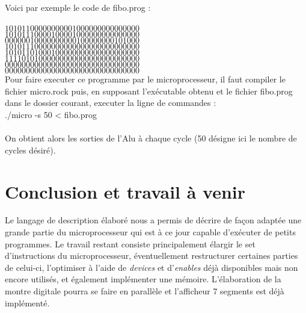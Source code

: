 \documentclass[13pt]{article}
\begin{document}
Voici par exemple le code de fibo.prog :\\
\textit{}\\
$10101100000000001000000000000000$\\
$10101110000100001000000000000000$\\
$00000010000000000100000000101000$\\
$10101110000000000000000000000000$\\
$10101101000100000000000000000000$\\
$11110101000000000000000000000000$\\
$00000000000000000000000000000000$\\
$00000000000000000000000000000000$\\


Pour faire executer ce programme par le microprocesseur, 
il faut compiler le fichier micro.rock
puis, en supposant l'exécutable obtenu et le fichier 
fibo.prog dans le dossier courant, executer la ligne de 
commandes : \\
./micro -s 50 < fibo.prog\\
\textit{}\\
On obtient alors les sorties de l'Alu à chaque cycle 
(50 désigne ici le nombre de cycles désiré).

\section{Conclusion et travail à venir}

Le langage de description élaboré nous a permis 
de décrire de façon adaptée
une grande partie du microprocesseur qui 
est à ce jour capable d'exécuter de petits programmes.
Le travail restant consiste principalement élargir 
le set d'instructions du microprocesseur, éventuellement 
restructurer certaines parties de celui-ci, l'optimiser à l'aide 
de 
\textit{devices} et d'\textit{enables} déjà disponibles mais
non encore utilisés, et également implémenter une mémoire.
L'élaboration de la montre digitale pourra se faire en 
parallèle et l'afficheur 7 segments est déjà implémenté.
\end{document}
